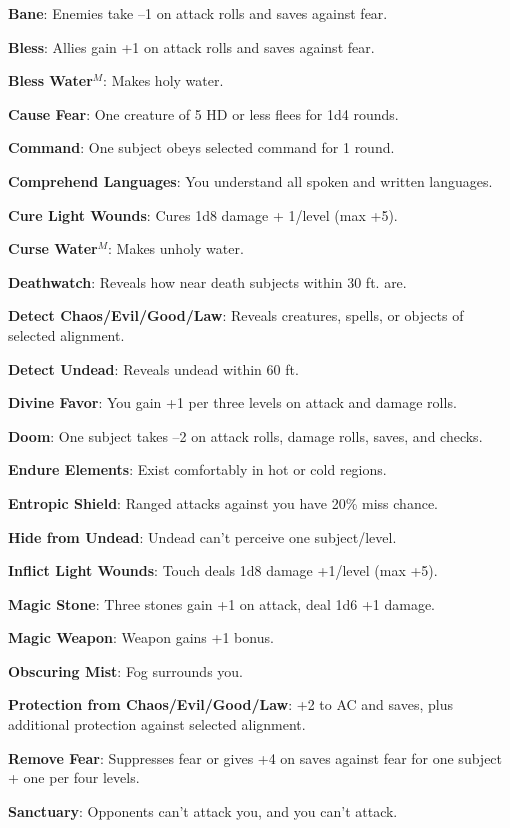 \textbf{Bane}: Enemies take --1 on attack rolls and saves against fear.

\textbf{Bless}: Allies gain +1 on attack rolls and saves against fear.

\textbf{Bless Water}\(^{M}\): Makes holy water.

\textbf{Cause Fear}: One creature of 5 HD or less flees for 1d4 rounds.

\textbf{Command}: One subject obeys selected command for 1 round.

\textbf{Comprehend Languages}: You understand all spoken and written languages.

\textbf{Cure Light Wounds}: Cures 1d8 damage + 1/level (max +5).

\textbf{Curse Water}\(^{M}\): Makes unholy water.

\textbf{Deathwatch}: Reveals how near death subjects within 30 ft. are.

\textbf{Detect Chaos/Evil/Good/Law}: Reveals creatures, spells, or objects of selected alignment.

\textbf{Detect Undead}: Reveals undead within 60 ft.

\textbf{Divine Favor}: You gain +1 per three levels on attack and damage rolls.

\textbf{Doom}: One subject takes --2 on attack rolls, damage rolls, saves, and checks.

\textbf{Endure Elements}: Exist comfortably in hot or cold regions.

\textbf{Entropic Shield}: Ranged attacks against you have 20\% miss chance.

\textbf{Hide from Undead}: Undead can't perceive one subject/level.

\textbf{Inflict Light Wounds}: Touch deals 1d8 damage +1/level (max +5).

\textbf{Magic Stone}: Three stones gain +1 on attack, deal 1d6 +1 damage.

\textbf{Magic Weapon}: Weapon gains +1 bonus.

\textbf{Obscuring Mist}: Fog surrounds you.

\textbf{Protection from Chaos/Evil/Good/Law}: +2 to AC and saves, plus additional protection against selected alignment.

\textbf{Remove Fear}: Suppresses fear or gives +4 on saves against fear for one subject + one per four levels.

\textbf{Sanctuary}: Opponents can't attack you, and you can't attack.

